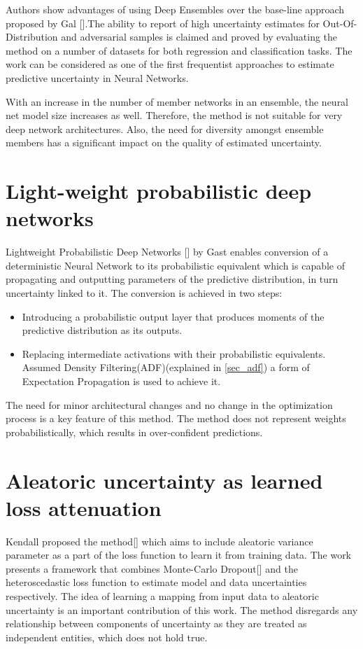 	  Authors show advantages of using Deep Ensembles over the base-line approach proposed by Gal {\etal} [\cite{gal2016dropout}].The ability to report of high uncertainty estimates for Out-Of-Distribution and adversarial samples is claimed and proved by evaluating the method on a number of datasets for both regression and classification tasks. The work can be considered as one of the first frequentist approaches to estimate predictive uncertainty in Neural Networks.
	  
	  With an increase in the number of member networks in an ensemble, the neural net model size increases as well. Therefore, the method is not suitable for very deep network architectures. Also, the need for diversity amongst ensemble members has a significant impact on the quality of estimated uncertainty.  
	\section{Light-weight probabilistic deep networks}
	 Lightweight Probabilistic Deep Networks [\cite{gast2018lightweight}] by Gast {\etal} enables conversion of a deterministic Neural Network to its probabilistic equivalent which is capable of propagating and outputting parameters of the predictive distribution, in turn uncertainty linked to it. The conversion is achieved in two steps: 
	 \begin{itemize}
	 \item Introducing a probabilistic output layer that produces moments of the predictive distribution as its outputs.
	 \item Replacing intermediate activations with their probabilistic equivalents. Assumed Density Filtering(ADF)(explained in \ref{sec_adf}) a form of Expectation Propagation is used to achieve it. 
	 \end{itemize}
	 
	 The need for minor architectural changes and no change in the optimization process is a key feature of this method. The method does not represent weights probabilistically, which results in over-confident predictions.
	  
	  
	\section{Aleatoric uncertainty as learned loss attenuation}
	Kendall {\etal} proposed the method[\cite{kendall2017what}] which aims to include aleatoric variance parameter as a part of the loss function to learn it from training data. The work presents a framework that combines Monte-Carlo Dropout[\cite{gal2016dropout}] and the heteroscedastic loss function to estimate model and data uncertainties respectively. The idea of learning a mapping from input data to aleatoric uncertainty is an important contribution of this work.
	The method disregards any relationship between components of uncertainty as they are treated as independent entities, which does not hold true.
